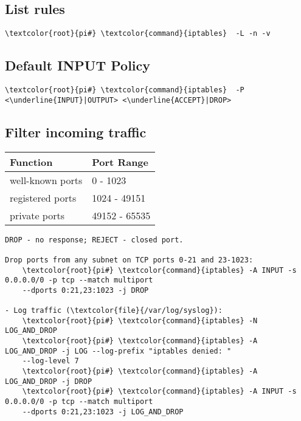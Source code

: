 \documentclass[10pt, a4paper, onecolumn, openany]{book} %
\begin{document}
\subsection{List rules}
\begin{Verbatim}[commandchars=\\\{\}]
    \textcolor{root}{pi#} \textcolor{command}{iptables}  -L -n -v
\end{Verbatim}

\subsection{Default INPUT Policy}
\begin{Verbatim}[commandchars=\\\{\}]
    \textcolor{root}{pi#} \textcolor{command}{iptables}  -P <\underline{INPUT}|OUTPUT> <\underline{ACCEPT}|DROP>
\end{Verbatim}

\subsection{Filter incoming traffic}
\begin{center}
    \begin{small}
    \begin{tabular}{|p{4cm}|p{4cm}|}
    \hline
    \textbf{Function} & \textbf{Port Range} \\
    \hline
    well-known ports & 0 - 1023  \\
    \hline
    registered ports & 1024 - 49151 \\
    \hline
    private ports & 49152 - 65535 \\
    \hline
    \end{tabular}
    \end{small}
\end{center}
\begin{Verbatim}[commandchars=\\\{\}]
DROP - no response; REJECT - closed port.

Drop ports from any subnet on TCP ports 0-21 and 23-1023:
    \textcolor{root}{pi#} \textcolor{command}{iptables} -A INPUT -s 0.0.0.0/0 -p tcp --match multiport
    --dports 0:21,23:1023 -j DROP
    
- Log traffic (\textcolor{file}{/var/log/syslog}):    
    \textcolor{root}{pi#} \textcolor{command}{iptables} -N LOG_AND_DROP
    \textcolor{root}{pi#} \textcolor{command}{iptables} -A LOG_AND_DROP -j LOG --log-prefix "iptables denied: "
    --log-level 7
    \textcolor{root}{pi#} \textcolor{command}{iptables} -A LOG_AND_DROP -j DROP    
    \textcolor{root}{pi#} \textcolor{command}{iptables} -A INPUT -s 0.0.0.0/0 -p tcp --match multiport
    --dports 0:21,23:1023 -j LOG_AND_DROP
\end{Verbatim}
\end{document}
